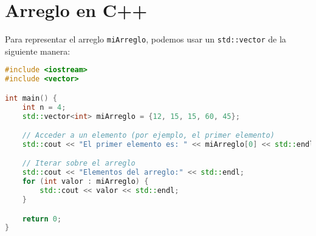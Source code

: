 \documentclass{article}
\begin{document}
\section*{Arreglo en C++}

Para representar el arreglo \lstinline{miArreglo}, podemos usar un \lstinline{std::vector} de la siguiente manera:

\begin{lstlisting}[language=C++, frame=single, caption={Ejemplo de un arreglo (vector) en C++}, breaklines=true]
#include <iostream>
#include <vector>

int main() {
    int n = 4;
    std::vector<int> miArreglo = {12, 15, 15, 60, 45};

    // Acceder a un elemento (por ejemplo, el primer elemento)
    std::cout << "El primer elemento es: " << miArreglo[0] << std::endl;

    // Iterar sobre el arreglo
    std::cout << "Elementos del arreglo:" << std::endl;
    for (int valor : miArreglo) {
        std::cout << valor << std::endl;
    }

    return 0;
}
\end{lstlisting}
\end{document}

